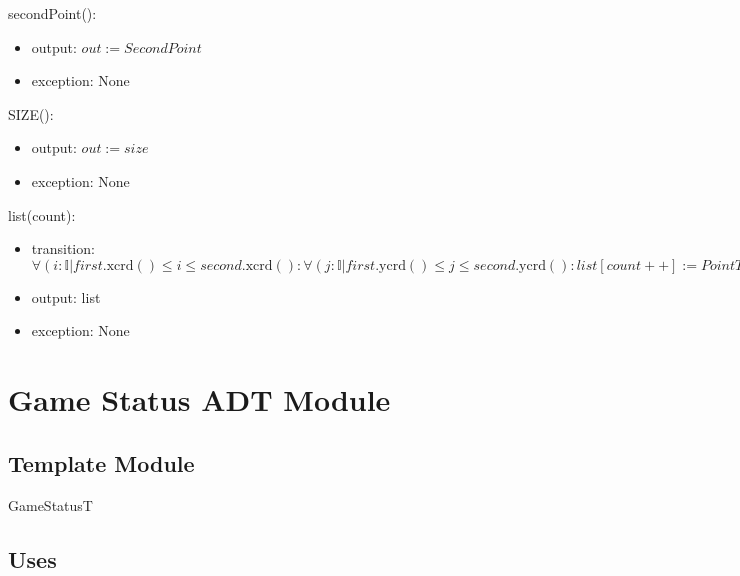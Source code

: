\documentclass[12pt]{article}
\begin{document}
\noindent secondPoint():
\begin{itemize}
\item output: $out := SecondPoint$
\item exception: None
\end{itemize}

\noindent SIZE():
\begin{itemize}
\item output: $out := size$
\item exception: None
\end{itemize}

\noindent list(count):
\begin{itemize}
\item transition: $ \forall(i : \mathbb{I} | first.\mbox{xcrd}() \leq i \leq second.\mbox{xcrd}() : \forall(j : \mathbb{I} | first.\mbox{ycrd}() \leq j \leq second.\mbox{ycrd}(): list[count++] := PointT(i++,j++)))$
\item output: list
\item exception: None
\end{itemize}

%
%

\newpage

\section* {Game Status ADT Module}

\subsection* {Template Module}

GameStatusT

\subsection* {Uses}
\end{document}

